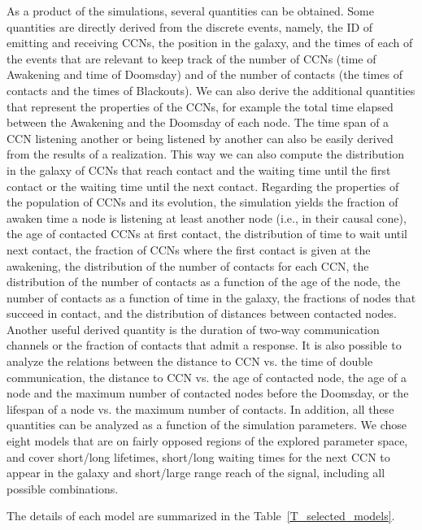 \documentclass[crop]{CSLB}
\newcommand{\ceti}{CCN}
\newcommand{\cetis}{CCNs}
\newcommand{\ttn}[1]{}
\begin{document}
As a product of the simulations, several quantities can be obtained.
%
Some quantities are directly derived from the discrete events, namely,
the ID of emitting and receiving \cetis{}, the position in the galaxy, and
the times of each of the events that are relevant to keep track of the
number of \cetis{} (time of Awakening and time of Doomsday) and of the
number of contacts (the times of contacts and the times of Blackouts).
%
We can also derive the additional quantities that represent the
properties of the \cetis{}, for example the total time elapsed between the
Awakening and the Doomsday of each node.
%
The time span of a \ceti{} listening another or being listened by another
can also be easily derived from the results of a realization.
%
This way we can also compute the distribution in the galaxy of
\cetis{}
that reach contact and the waiting time until the first contact or the
waiting time until the next contact.
%
Regarding the properties of the population of \cetis{} and its evolution,
the simulation yields the fraction of awaken time a node is listening
at least another node (i.e., in their causal cone), the age of
contacted \cetis{} at first contact, the distribution of time to wait
until next contact, the fraction of \cetis{} where the first contact is
given at the awakening, the distribution of the number of contacts for
each \ceti{}, the distribution of the number of contacts as a function of
the age of the node, the number of contacts as a function of time in the galaxy,
the fractions of nodes that succeed in contact, and the distribution of
distances between contacted nodes.
%
Another useful derived quantity is the duration of two-way
communication channels or the fraction of contacts that admit a
response.
% 
It is also possible to analyze the relations between the distance to
\ceti{} vs. the time of double communication, the distance to \ceti{} vs. the
age of contacted node, the age of a node and the maximum number of
contacted nodes before the Doomsday, or the lifespan of a node vs. the
maximum number of contacts.
%
In addition, all these quantities can be analyzed as a function of the
simulation parameters.
%
We chose eight models that are on fairly opposed regions of the
explored parameter space, and cover short/long lifetimes, short/long
waiting times for the next \ceti{} to appear in the galaxy and short/large
range reach of the signal, including all possible combinations.
%
\ttn{2}
%
The details of each model are summarized in the
Table~\ref{T_selected_models}.

\end{document}
